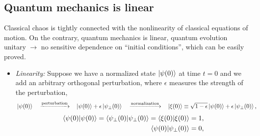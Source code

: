 \documentclass[a4paper,11pt,twoside]{article}
\begin{document}
    \subsection{Quantum mechanics is linear}
        Classical chaos is tightly connected with the nonlinearity of classical equations of motion.
        On the contrary, quantum mechanics is linear, quantum evolution unitary $\longrightarrow$ no sensitive dependence on ``initial conditions'', which can be easily proved.
        \begin{itemize}
            \item 
                \emph{Linearity:} Suppose we have a normalized state $\left|{\psi(0)}\right\rangle$ at time $t=0$ and we add an arbitrary orthogonal perturbation, where $\epsilon$ measures the strength of the perturbation,
                \begin{align}
                    &\left|{\psi(0)}\right\rangle
                    &&\xrightarrow{\text{perturbation}}
                    &&\left|{\psi(0)}\right\rangle+\epsilon\left|{\psi_{\perp}(0)}\right\rangle
                    &&\xrightarrow{\text{normalization}}
                    &&\left|{\xi(0)}\right\rangle\equiv\sqrt{1-\epsilon}\left|{\psi(0)}\right\rangle+\epsilon\left|{\psi_{\perp}(0)}\right\rangle,
                \end{align}
                \begin{align}
                    \left\langle{\psi(0)}\middle|{\psi(0)}\right\rangle=\left\langle{\psi_{\perp}(0)}\middle|{\psi_{\perp}(0)}\right\rangle=\left\langle{\xi(0)}\middle|{\xi(0)}\right\rangle=1,\nonumber\\
                    \label{eq:LinearityOrthogonality0}
                    \left\langle{\psi(0)}\middle|{\psi_{\perp}(0)}\right\rangle=0,                 
                \end{align}
            

\end{itemize}
\end{document}
